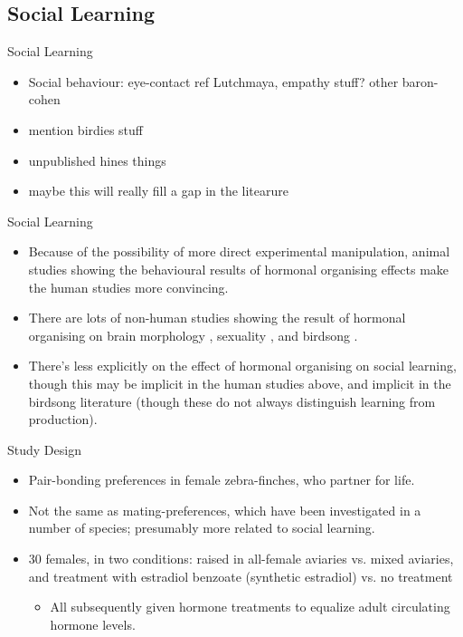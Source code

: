 \documentclass[hyperref={pdfpagelabels=false}]{beamer}
\begin{document}
\subsection{Social Learning}

\begin{frame}{Social Learning}
\begin{itemize}
	\item Social behaviour: eye-contact ref Lutchmaya, empathy stuff? other baron-cohen
	\item mention birdies stuff

	\item unpublished hines things
	\item maybe this will really fill a gap in the litearure
\end{itemize}

\end{frame}

\begin{frame}{Social Learning}
\begin{itemize}
	\item Because of the possibility of more direct experimental manipulation, animal studies showing the behavioural results of hormonal organising effects make the human studies more convincing.
	\item There are lots of non-human studies showing the result of hormonal organising on brain morphology \citep[e.g. in rats, going back to][]{gorski1978}, sexuality \citep[many references in][Chapts. 3-4]{balthazart2011}, and birdsong \citep[see][for an overview]{balthazartetal2009}.
	\item There's less explicitly on the effect of hormonal organising on social learning, though this may be implicit in the human studies above, and implicit in the birdsong literature (though these do not always distinguish learning from production).
\end{itemize}

\end{frame}

\begin{frame}{\citet{mansukhanietal1996}}
\begin{block}{Study Design}
\begin{itemize}
	\item Pair-bonding preferences in female zebra-finches, who partner for life.
	\item Not the same as mating-preferences, which have been investigated in a number of species; presumably more related to social learning.
	\item 30 females, in two conditions: raised in all-female aviaries vs. mixed aviaries, and treatment with estradiol benzoate (synthetic estradiol) vs. no treatment
		\begin{itemize}
		\item All subsequently given hormone treatments to equalize adult circulating hormone levels.
		\end{itemize}
\end{itemize}
\end{block}
\end{frame}
\end{document}
